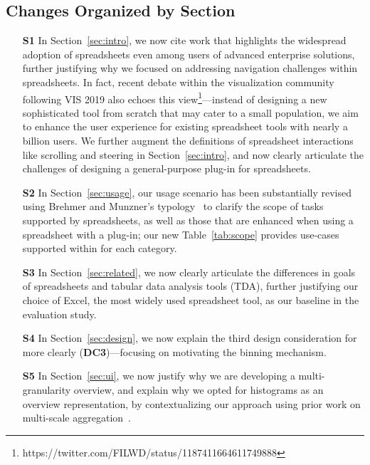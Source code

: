 \subsection*{Changes Organized by Section}
\begin{itemize}
	\leftmargin=25pt \rightmargin=0pt   \itemindent=0pt \listparindent=0pt \topsep=0pt plus 2pt minus 4pt \partopsep=0pt plus 1pt minus 1pt \parsep=0pt plus 1pt \itemsep=\parsep
\item[\textbf{S1}]
In Section~\ref{sec:intro}, we now cite
work that highlights the widespread adoption
of spreadsheets even among users of 
advanced enterprise solutions, further justifying 
why we focused on addressing navigation challenges within
spreadsheets. In fact, recent 
debate within the visualization community following
VIS 2019 also echoes this view\footnote{https://twitter.com/FILWD/status/1187411664611749888}---instead of designing a new sophisticated tool from scratch that 
may cater to a small population, 
we aim to enhance the user experience for
existing spreadsheet tools
with nearly a billion users.
We further augment   
the definitions of spreadsheet 
interactions like scrolling and steering in Section~\ref{sec:intro}, 
and now clearly articulate the challenges of 
designing a general-purpose plug-in for spreadsheets.
\item[\textbf{S2}]
In Section~\ref{sec:usage}, 
our usage scenario has been substantially revised 
using Brehmer and Munzner's typology~\cite{brehmer2013multi} to
clarify the scope of tasks supported by spreadsheets, as well
as those that are enhanced
when using a spreadsheet with a \noah plug-in; our new Table~\ref{tab:scope}
provides use-cases supported within \noah
for each category.
\item[\textbf{S3}]
In Section~\ref{sec:related},
we now clearly
articulate the differences in goals
of spreadsheets and tabular data analysis tools (TDA),
further justifying our choice of Excel,
the most widely used spreadsheet tool,
as our baseline in the evaluation study.
\item[\textbf{S4}]
In Section~\ref{sec:design},
we now explain the  
third design consideration 
for \noah more clearly
(\textbf{DC3})---focusing on motivating the binning
mechanism.
\item[\textbf{S5}] In Section~\ref{sec:ui}, 
we now justify why we are developing a 
multi-granularity overview,
and explain why 
we opted for histograms as an overview representation, by contextualizing our
approach using prior work on multi-scale aggregation~\cite{elmqvist2009hierarchical}. 

\end{itemize}
